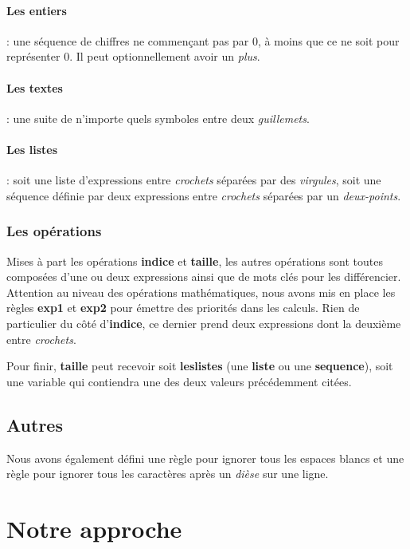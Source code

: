 \paragraph{Les entiers}: une séquence de chiffres ne commençant pas par 0, à moins que ce ne soit pour représenter 0. Il peut optionnellement avoir un \textit{plus}.

\paragraph{Les textes}: une suite de n'importe quels symboles entre deux \textit{guillemets}.

\paragraph{Les listes}: soit une liste d'expressions entre \textit{crochets} séparées par des \textit{virgules}, soit une séquence définie par deux expressions entre \textit{crochets} séparées par un \textit{deux-points}. 

\subsubsection{Les opérations}
Mises à part les opérations \textbf{indice} et \textbf{taille}, les autres opérations sont toutes composées d'une ou deux expressions ainsi que de mots clés pour les différencier. 
Attention au niveau des opérations mathématiques, nous avons mis en place les règles \textbf{exp1} et \textbf{exp2} pour émettre des priorités dans les calculs.
Rien de particulier du côté d'\textbf{indice}, ce dernier prend deux expressions dont la deuxième entre \textit{crochets}.

Pour finir, \textbf{taille} peut recevoir soit \textbf{leslistes} (une \textbf{liste} ou une \textbf{sequence}), soit une variable qui contiendra une des deux valeurs précédemment citées.

\subsection{Autres}
Nous avons également défini une règle pour ignorer tous les espaces blancs et une règle pour ignorer tous les caractères après un \textit{dièse} sur une ligne.

\section{Notre approche}
